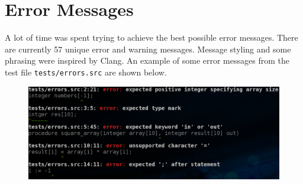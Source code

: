 \documentclass[10pt]{article}
\begin{document}
\section{Error Messages}
A lot of time was spent trying to achieve the best possible error messages.
There are currently 57 unique error and warning messages. Message styling and
some phrasing were inspired by Clang. An example of some error messages from the
test file \texttt{tests/errors.src} are shown below.
\begin{figure}[H]
    \centering
    \includegraphics[width=0.75\linewidth]{./errors.png}
\end{figure}
\end{document}
